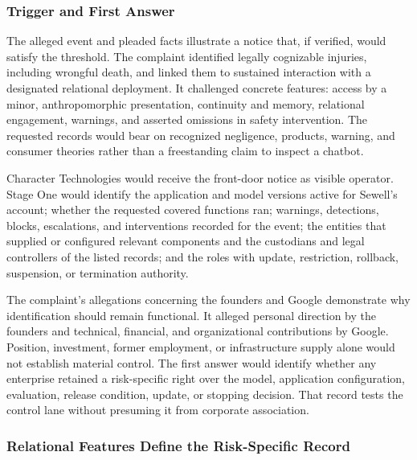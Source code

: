 \subsubsection{Trigger and First Answer}

The alleged event and pleaded facts illustrate a notice that, if verified, would satisfy the threshold. The complaint identified legally cognizable injuries, including wrongful death, and linked them to sustained interaction with a designated relational deployment. It challenged concrete features: access by a minor, anthropomorphic presentation, continuity and memory, relational engagement, warnings, and asserted omissions in safety intervention. The requested records would bear on recognized negligence, products, warning, and consumer theories rather than a freestanding claim to inspect a chatbot.

Character Technologies would receive the front-door notice as visible operator. Stage One would identify the application and model versions active for Sewell's account; whether the requested covered functions ran; warnings, detections, blocks, escalations, and interventions recorded for the event; the entities that supplied or configured relevant components and the custodians and legal controllers of the listed records; and the roles with update, restriction, rollback, suspension, or termination authority.

The complaint's allegations concerning the founders and Google demonstrate why identification should remain functional. It alleged personal direction by the founders and technical, financial, and organizational contributions by Google. Position, investment, former employment, or infrastructure supply alone would not establish material control. The first answer would identify whether any enterprise retained a risk-specific right over the model, application configuration, evaluation, release condition, update, or stopping decision. That record tests the control lane without presuming it from corporate association.

\subsubsection{Relational Features Define the Risk-Specific Record}

